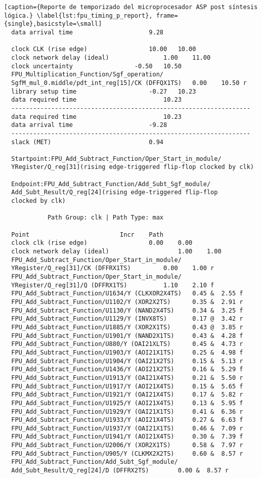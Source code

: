 \begin{lstlisting}[caption={Reporte de temporizado del microprocesador ASP post síntesis lógica.} \label{lst:fpu_timing_p_report}, frame={single},basicstyle=\small]
  data arrival time						9.28

  clock CLK (rise edge)					10.00	10.00
  clock network delay (ideal)				1.00	11.00
  clock uncertainty					-0.50	10.50
  FPU_Multiplication_Function/Sgf_operation/
  SgfM_mul_0.middle/pdt_int_reg[15]/CK (DFFQX1TS)	0.00	10.50 r
  library setup time					-0.27	10.23
  data required time						10.23
  ------------------------------------------------------------------
  data required time						10.23
  data arrival time						-9.28
  ------------------------------------------------------------------
  slack (MET)							0.94
  
  Startpoint:FPU_Add_Subtract_Function/Oper_Start_in_module/
  YRegister/Q_reg[31](rising edge-triggered flip-flop clocked by clk)
  
  Endpoint:FPU_Add_Subtract_Function/Add_Subt_Sgf_module/
  Add_Subt_Result/Q_reg[24](rising edge-triggered flip-flop
  clocked by clk)
  
  			Path Group: clk | Path Type: max

  Point							Incr	Path
  clock clk (rise edge)					0.00	0.00
  clock network delay (ideal)           		1.00	1.00
  FPU_Add_Subtract_Function/Oper_Start_in_module/
  YRegister/Q_reg[31]/CK (DFFRX1TS)			0.00	1.00 r
  FPU_Add_Subtract_Function/Oper_Start_in_module/
  YRegister/Q_reg[31]/Q (DFFRX1TS)			1.10	2.10 f
  FPU_Add_Subtract_Function/U1634/Y (CLKXOR2X4TS)	0.45 &	2.55 f
  FPU_Add_Subtract_Function/U1102/Y (XOR2X2TS)		0.35 &	2.91 r
  FPU_Add_Subtract_Function/U1130/Y (NAND2X4TS)		0.34 &	3.25 f
  FPU_Add_Subtract_Function/U1129/Y (INVX8TS)		0.17 @  3.42 r
  FPU_Add_Subtract_Function/U1885/Y (XOR2X1TS)		0.43 @	3.85 r
  FPU_Add_Subtract_Function/U1901/Y (NAND2X1TS)		0.43 &	4.28 f
  FPU_Add_Subtract_Function/U880/Y (OAI21XLTS)		0.45 &	4.73 r
  FPU_Add_Subtract_Function/U1903/Y (AOI21X1TS)		0.25 &	4.98 f
  FPU_Add_Subtract_Function/U1904/Y (OAI21X2TS)		0.15 &	5.13 r
  FPU_Add_Subtract_Function/U1436/Y (AOI21X2TS)		0.16 &	5.29 f
  FPU_Add_Subtract_Function/U1913/Y (OAI21X4TS)		0.21 &	5.50 r
  FPU_Add_Subtract_Function/U1917/Y (AOI21X4TS)		0.15 &	5.65 f
  FPU_Add_Subtract_Function/U1921/Y (OAI21X4TS)		0.17 &	5.82 r
  FPU_Add_Subtract_Function/U1925/Y (AOI21X4TS)		0.13 &	5.95 f
  FPU_Add_Subtract_Function/U1929/Y (OAI21X1TS)		0.41 &	6.36 r
  FPU_Add_Subtract_Function/U1933/Y (AOI21X4TS)		0.27 &	6.63 f
  FPU_Add_Subtract_Function/U1937/Y (OAI21X1TS)		0.46 &	7.09 r
  FPU_Add_Subtract_Function/U1941/Y (AOI21X4TS)		0.30 &	7.39 f
  FPU_Add_Subtract_Function/U2006/Y (XOR2X1TS)		0.58 &	7.97 r
  FPU_Add_Subtract_Function/U905/Y (CLKMX2X2TS)		0.60 &	8.57 r
  FPU_Add_Subtract_Function/Add_Subt_Sgf_module/
  Add_Subt_Result/Q_reg[24]/D (DFFRX2TS)		0.00 &	8.57 r
  

\end{lstlisting}
